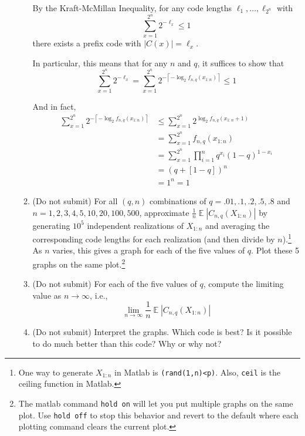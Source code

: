 \documentclass[11pt]{report}
\DeclareMathOperator{\Exp}{\mathbb{E}}
\newcommand{\abs}[1]{\left\vert #1 \right\vert}
\newcommand{\ceil}[1]{\left\lceil #1 \right\rceil}
\begin{document}
\begin{enumerate}[1.]
\begin{enumerate}
                    \color{blue}
                    By the Kraft-McMillan Inequality, for any code lengths $\ell_1, \dots, \ell_{2^n}$ with
                    \[\sum_{x=1}^{2^n} 2^{-\ell_x} \leq 1\]
                    there exists a prefix code with $\abs{C(x)} = \ell_x$.

                    In particular, this means that for any $n$ and $q$, it suffices to show that
                    \[\sum_{x=1}^{2^n} 2^{-\ell_x} = \sum_{x=1}^{2^n} 2^{-\ceil{-\log_2 f_{n, q}(x_{1:n})}} \leq 1\]

                    And in fact,
                    \color{blue}
                    \begin{align*}
                        \sum_{x=1}^{2^n} 2^{-\ceil{-\log_2 f_{n, q}(x_{1:n})}} & \leq \sum_{x=1}^{2^n} 2^{\log_2 f_{n, q}(x_{1:n} + 1)} \\
                                                                               & = \sum_{x=1}^{2^n} f_{n, q}(x_{1:n})                   \\
                                                                               & = \sum_{x=1}^{2^n} \prod_{i=1}^n q^{x_i}(1-q)^{1- x_i} \\
                                                                               & = (q + [1 - q])^n                                      \\
                                                                               & = 1^n = 1
                    \end{align*}
                    \color{black}


              \item {\color{blue} (Do not submit)} For all $(q,n)$ combinations of $q=.01,.1,.2,.5,.8$ and $n=1,2,3,4,5,10,20,100,500$, approximate $\frac{1}{n}\Exp|C_{n,q}(X_{1:n})|$ by generating $10^5$ independent realizations of $X_{1:n}$ and averaging the corresponding code lengths for each realization (and then divide by $n$).\footnote{One way to generate $X_{1:n}$ in Matlab is {\tt (rand(1,n)<p)}. Also, {\tt ceil} is the ceiling function in Matlab.}  As $n$ varies, this gives a graph for each of the five values of $q$.  Plot these 5 graphs on the same plot.\footnote{The matlab command {\tt hold on} will let you put multiple graphs on the same plot. Use {\tt hold off} to stop this behavior and revert to the default where each plotting command clears the current plot.}

              \item {\color{blue} (Do not submit)}   For each of the five values of $q$, compute the limiting value as $n\to\infty$, i.e.,
                    \[ \lim_{n\to\infty}\frac{1}{n}\Exp|C_{n,q}(X_{1:n})| \]
              \item {\color{blue} (Do not submit)}  Interpret the graphs.  Which code is best?  Is it possible to do much better than this code?  Why or why not?
          \end{enumerate}



\end{enumerate}
\end{document}
